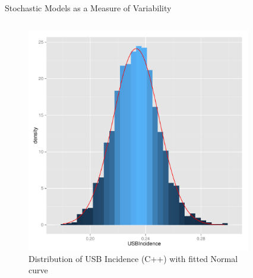 \documentclass[final]{beamer}
\begin{document}
\begin{frame}
\begin{columns}[T]
\begin{column}{.3\textwidth}
      \begin{block}{Stochastic Models as a Measure of Variability}
        \begin{columns}
          \begin{column}{.45\textwidth}
            \begin{figure}[h]
              \begin{center}
                \includegraphics[width=\textwidth]{IN0dist}
              \end{center}
              \caption{Distribution of USB Incidence (C++) with fitted Normal curve}
              \label{fig:IN0dist}
            \end{figure}
          \end{column}
          \begin{column}{.45\textwidth}
            \begin{figure}[h]
              \begin{center}

\end{center}
\end{figure}
\end{column}
\end{columns}
\end{block}
\end{column}
\end{columns}
\end{frame}
\end{document}
